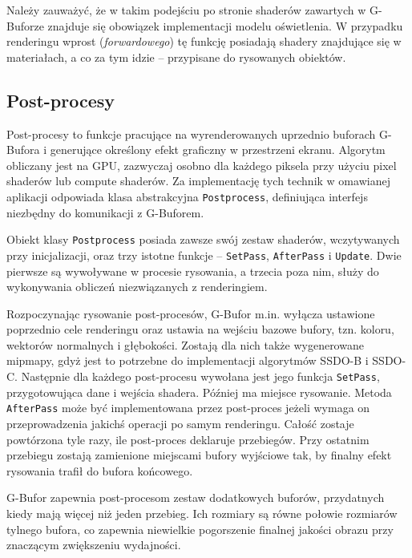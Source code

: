 		Należy zauważyć, że w takim podejściu po stronie shaderów zawartych w G-Buforze znajduje się obowiązek implementacji modelu oświetlenia. W przypadku renderingu wprost (\emph{forwardowego}) tę funkcję posiadają shadery znajdujące się w materiałach, a co za tym idzie -- przypisane do rysowanych obiektów.
		
		\subsection{Post-procesy}
		\label{t:budowa:rendering:postprocesy}
		
		
		Post-procesy to funkcje pracujące na wyrenderowanych uprzednio buforach G-Bufora i generujące określony efekt graficzny w przestrzeni ekranu. Algorytm obliczany jest na GPU, zazwyczaj osobno dla każdego piksela przy użyciu pixel shaderów lub compute shaderów. Za implementację tych technik w omawianej aplikacji odpowiada klasa abstrakcyjna \texttt{Postprocess}, definiująca interfejs niezbędny do komunikacji z G-Buforem.
		
		Obiekt klasy \texttt{Postprocess} posiada zawsze swój zestaw shaderów, wczytywanych przy inicjalizacji, oraz trzy istotne funkcje -- \texttt{SetPass}, \texttt{AfterPass} i \texttt{Update}. Dwie pierwsze są wywoływane w procesie rysowania, a trzecia poza nim, służy do wykonywania obliczeń niezwiązanych z renderingiem.
		
		Rozpoczynając rysowanie post-procesów, G-Bufor m.in. wyłącza ustawione poprzednio cele renderingu oraz ustawia na wejściu bazowe bufory, tzn. koloru, wektorów normalnych i głębokości. Zostają dla nich także wygenerowane mipmapy, gdyż jest to potrzebne do implementacji algorytmów SSDO-B i SSDO-C. Następnie dla każdego post-procesu wywołana jest jego funkcja \texttt{SetPass}, przygotowująca dane i wejścia shadera. Później ma miejsce rysowanie. Metoda \texttt{AfterPass} może być implementowana przez post-proces jeżeli wymaga on przeprowadzenia jakichś operacji po samym renderingu. Całość zostaje powtórzona tyle razy, ile post-proces deklaruje przebiegów. Przy ostatnim przebiegu zostają zamienione miejscami bufory wyjściowe tak, by finalny efekt rysowania trafił do bufora końcowego.
		
		G-Bufor zapewnia post-procesom zestaw dodatkowych buforów, przydatnych kiedy mają więcej niż jeden przebieg. Ich rozmiary są równe połowie rozmiarów tylnego bufora, co zapewnia niewielkie pogorszenie finalnej jakości obrazu przy znaczącym zwiększeniu wydajności.
		
